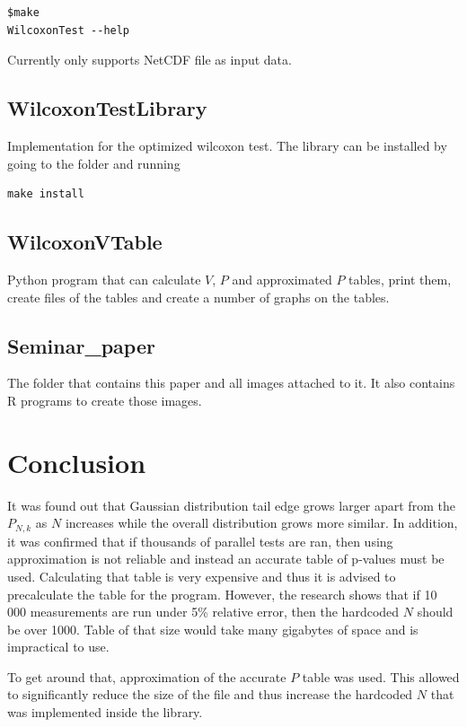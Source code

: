 \documentclass[12pt]{article}
\begin{document}
\begin{lstlisting}
$make
WilcoxonTest --help
\end{lstlisting}

Currently only supports NetCDF file as input data.

\subsection{WilcoxonTestLibrary}
Implementation for the optimized wilcoxon test. The library can be installed by going to the folder and running

\begin{lstlisting}
make install
\end{lstlisting}

\subsection{WilcoxonVTable}
Python program that can calculate $V$, $P$ and approximated $P$ tables, print them, create files of the tables and create a number of graphs on the tables.

\subsection{Seminar\_paper}
The folder that contains this paper and all images attached to it. It also contains R programs to create those images.

\newpage

\section{Conclusion}
It was found out that Gaussian distribution tail edge grows larger apart from the $P_{N, k}$ as $N$ increases while the overall distribution grows more similar. In addition, it was confirmed that if thousands of parallel tests are ran, then using approximation is not reliable and instead an accurate table of p-values must be used. Calculating that table is very expensive and thus it is advised to precalculate the table for the program. However, the research shows that if 10 000 measurements are run under 5\% relative error, then the hardcoded $N$ should be over 1000. Table of that size would take many gigabytes of space and is impractical to use.

To get around that, approximation of the accurate $P$ table was used. This allowed to significantly reduce the size of the file and thus increase the hardcoded $N$ that was implemented inside the library.
\end{document}
